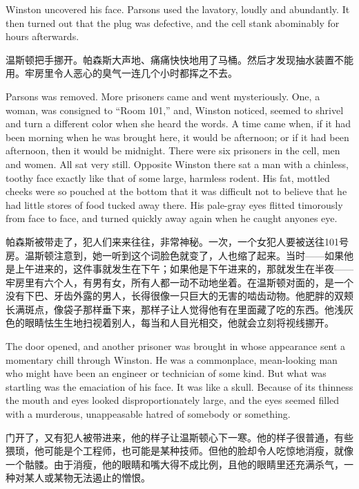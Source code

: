 \begin{paracol}{2}
Winston uncovered his face. Parsons used the lavatory, loudly and
abundantly. It then turned out that the plug was defective, and the cell
stank abominably for hours afterwards.

\switchcolumn

温斯顿把手挪开。帕森斯大声地、痛痛快快地用了马桶。然后才发现抽水装置不能用。牢房里令人恶心的臭气一连几个小时都挥之不去。

\switchcolumn*

Parsons was removed. More prisoners came and went mysteriously. One, a
woman, was consigned to ``Room 101,'' and, Winston noticed, seemed to
shrivel and turn a different color when she heard the words. A time came
when, if it had been morning when he was brought here, it would be
afternoon; or if it had been afternoon, then it would be midnight. There
were six prisoners in the cell, men and women. All sat very still.
Opposite Winston there sat a man with a chinless, toothy face exactly
like that of some large, harmless rodent. His fat, mottled cheeks were
so pouched at the bottom that it was difficult not to believe that he
had little stores of food tucked away there. His pale-gray eyes flitted
timorously from face to face, and turned quickly away again when he
caught anyone\textquotesingle s eye.

\switchcolumn

帕森斯被带走了，犯人们来来往往，非常神秘。一次，一个女犯人要被送往101号房。温斯顿注意到，她一听到这个词脸色就变了，人也缩了起来。当时——如果他是上午进来的，这件事就发生在下午；如果他是下午进来的，那就发生在半夜——牢房里有六个人，有男有女，所有人都一动不动地坐着。在温斯顿对面的，是一个没有下巴、牙齿外露的男人，长得很像一只巨大的无害的啮齿动物。他肥胖的双颊长满斑点，像袋子那样垂下来，那样子让人觉得他有在里面藏了吃的东西。他浅灰色的眼睛怯生生地扫视着别人，每当和人目光相交，他就会立刻将视线挪开。

\switchcolumn*

The door opened, and another prisoner was brought in whose appearance
sent a momentary chill through Winston. He was a commonplace,
mean-looking man who might have been an engineer or technician of some
kind. But what was startling was the emaciation of his face. It was like
a skull. Because of its thinness the mouth and eyes looked
disproportionately large, and the eyes seemed filled with a murderous,
unappeasable hatred of somebody or something.

\switchcolumn

门开了，又有犯人被带进来，他的样子让温斯顿心下一寒。他的样子很普通，有些猥琐，他可能是个工程师，也可能是某种技师。但他的脸却令人吃惊地消瘦，就像一个骷髅。由于消瘦，他的眼睛和嘴大得不成比例，且他的眼睛里还充满杀气，一种对某人或某物无法遏止的憎恨。


\end{paracol}

